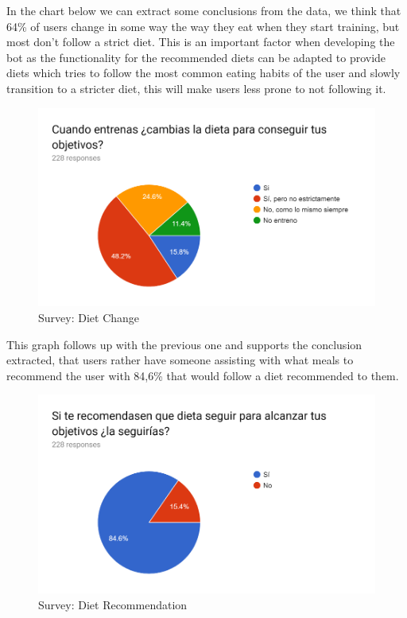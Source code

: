 In the chart below we can extract some conclusions from the data, we think that 64\% of users change in some way the way they eat when they start training, but most don’t follow a strict diet. This is an important factor when developing the bot as the functionality for the recommended diets can be adapted to provide diets which tries to follow the most common eating habits of the user and slowly transition to a stricter diet, this will make users less prone to not following it.

\begin{center}
	\begin{figure}[h!]
		\centering
		\includegraphics[scale=1]{./images/4-change-diet}
		\caption{Survey: Diet Change}
		\label{4_change_diet}
	\end{figure}
\end{center}

This graph follows up with the previous one and supports the conclusion extracted, that users rather have someone assisting with what meals to recommend the user with 84,6\% that would follow a diet recommended to them.

\begin{center}
	\begin{figure}[h!]
		\centering
		\includegraphics[scale=1]{./images/4-diet-rec}
		\caption{Survey: Diet Recommendation}
		\label{4_diet_rec}
	\end{figure}
\end{center}

